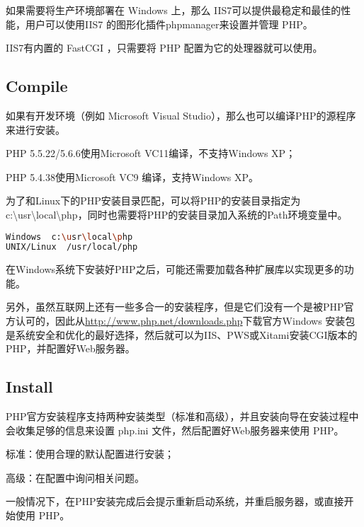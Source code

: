 如果需要将生产环境部署在 Windows 上，那么 IIS7可以提供最稳定和最佳的性能，用户可以使用IIS7 的图形化插件phpmanager来设置并管理 PHP。

IIS7有内置的 FastCGI ，只需要将 PHP 配置为它的处理器就可以使用。


\subsection{Compile}

如果有开发环境（例如 Microsoft Visual Studio），那么也可以编译PHP的源程序来进行安装。

\begin{compactitem}
\item PHP 5.5.22/5.6.6使用Microsoft VC11编译，不支持Windows XP；
\item PHP 5.4.38使用Microsoft VC9 编译，支持Windows XP。
\end{compactitem}

为了和Linux下的PHP安装目录匹配，可以将PHP的安装目录指定为c:\textbackslash usr\textbackslash local\textbackslash php，同时也需要将PHP的安装目录加入系统的Path环境变量中。

\begin{lstlisting}[language=bash]
Windows  c:\usr\local\php
UNIX/Linux  /usr/local/php
\end{lstlisting}



在Windows系统下安装好PHP之后，可能还需要加载各种扩展库以实现更多的功能。

另外，虽然互联网上还有一些多合一的安装程序，但是它们没有一个是被PHP官方认可的，因此从\url{http://www.php.net/downloads.php}下载官方Windows 安装包是系统安全和优化的最好选择，然后就可以为IIS、PWS或Xitami安装CGI版本的PHP，并配置好Web服务器。

\subsection{Install}


PHP官方安装程序支持两种安装类型（标准和高级），并且安装向导在安装过程中会收集足够的信息来设置 php.ini 文件，然后配置好Web服务器来使用 PHP。


\begin{compactitem}
\item 标准：使用合理的默认配置进行安装；
\item 高级：在配置中询问相关问题。
\end{compactitem}

一般情况下，在PHP安装完成后会提示重新启动系统，并重启服务器，或直接开始使用 PHP。

